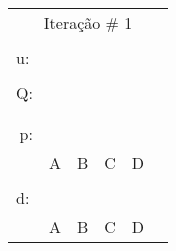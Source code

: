 \documentclass[16pt]{examdesign}
\begin{document}
\begin{fillin}[title={},
                    rearrange=no,resetcounter=no,suppressprefix]
\begin{question}
\begin{multicols}{4}
  \begin{tabular}{|llllll|}
  \hline
  \multicolumn{6}{|c|}{Iteração \# 1}                                                                                                          \\
					    &                       &                       &                       &                       &  \\
  u:                                        &                       &                       &                       &                       &  \\ \cline{2-3}
					    &                       &                       &                       &                       &  \\ \cline{2-5}
  \multicolumn{1}{|r|}{Q:}                  & \multicolumn{1}{l|}{} & \multicolumn{1}{l|}{} & \multicolumn{1}{l|}{} & \multicolumn{1}{l|}{} &  \\
  \multicolumn{1}{|l|}{}                    & \multicolumn{1}{l|}{} & \multicolumn{1}{l|}{} & \multicolumn{1}{l|}{} & \multicolumn{1}{l|}{} &  \\ \cline{2-5}
					    &                       &                       &                       &                       &  \\ \cline{2-5}
  \multicolumn{1}{|r|}{\multirow{2}{*}{p:}} & \multicolumn{1}{l|}{} & \multicolumn{1}{l|}{} & \multicolumn{1}{l|}{} & \multicolumn{1}{l|}{} &  \\
  \multicolumn{1}{|r|}{}                    & \multicolumn{1}{l|}{} & \multicolumn{1}{l|}{} & \multicolumn{1}{l|}{} & \multicolumn{1}{l|}{} &  \\ \cline{2-5}
					    & A                     & B                     & C                     & D                     &  \\
					    &                       &                       &                       &                       &  \\ \cline{2-5}
  \multicolumn{1}{|l|}{\multirow{2}{*}{d:}} & \multicolumn{1}{l|}{} & \multicolumn{1}{l|}{} & \multicolumn{1}{l|}{} & \multicolumn{1}{l|}{} &  \\
  \multicolumn{1}{|l|}{}                    & \multicolumn{1}{l|}{} & \multicolumn{1}{l|}{} & \multicolumn{1}{l|}{} & \multicolumn{1}{l|}{} &  \\ \cline{2-5}
					    & A                     & B                     & C                     & D                     &  \\ \hline

\end{tabular}
\end{multicols}
\end{question}
\end{fillin}
\end{document}
